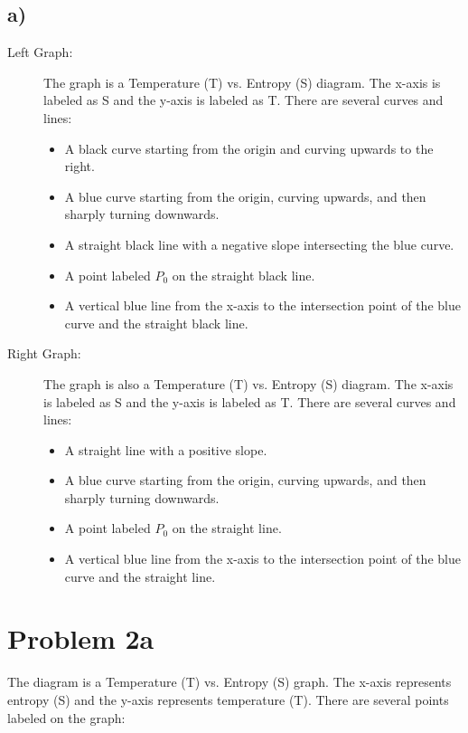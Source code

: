 

\subsection*{a)}

\begin{description}
    \item[Left Graph:] 
    The graph is a Temperature (T) vs. Entropy (S) diagram. The x-axis is labeled as S and the y-axis is labeled as T. There are several curves and lines:
    \begin{itemize}
        \item A black curve starting from the origin and curving upwards to the right.
        \item A blue curve starting from the origin, curving upwards, and then sharply turning downwards.
        \item A straight black line with a negative slope intersecting the blue curve.
        \item A point labeled $P_0$ on the straight black line.
        \item A vertical blue line from the x-axis to the intersection point of the blue curve and the straight black line.
    \end{itemize}
    
    \item[Right Graph:]
    The graph is also a Temperature (T) vs. Entropy (S) diagram. The x-axis is labeled as S and the y-axis is labeled as T. There are several curves and lines:
    \begin{itemize}
        \item A straight line with a positive slope.
        \item A blue curve starting from the origin, curving upwards, and then sharply turning downwards.
        \item A point labeled $P_0$ on the straight line.
        \item A vertical blue line from the x-axis to the intersection point of the blue curve and the straight line.
    \end{itemize}
\end{description}

\section*{Problem 2a}

The diagram is a Temperature (T) vs. Entropy (S) graph. The x-axis represents entropy (S) and the y-axis represents temperature (T). There are several points labeled on the graph:

